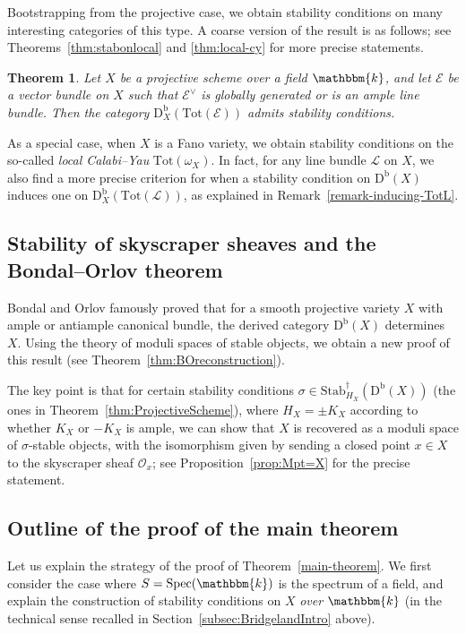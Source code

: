 \documentclass[11pt, reqno]{amsart}
\numberwithin{equation}{section}
\theoremstyle{plain}
\newtheorem{theorem}{Theorem}[section]
\theoremstyle{remark}
\theoremstyle{definition}
\theoremstyle{italicsname}
\newcommand{\Db}{\mathrm{D^b}}
\newcommand{\Stabdagger}{\mathrm{Stab}^\dagger}
\DeclareMathOperator{\Spec}{Spec}
\newcommand{\cO}{\mathcal{O}}
\newcommand{\cE}{\mathcal{E}}
\newcommand{\cL}{\mathcal{L}}
\newcommand{\KK}{\mathbbm{k}}
\begin{document}
Bootstrapping from the projective case, we obtain stability conditions on many interesting categories of this type. 
A coarse version of the result is as follows; see Theorems~\ref{thm:stabonlocal} and \ref{thm:local-cy} for more precise statements. 

\begin{theorem}\label{thm:LocalMain}
Let $X$ be a projective scheme over a field $\KK$, and let $\cE$ be a vector bundle on $X$ such that $\cE^{\vee}$ is globally generated or is an ample line bundle. 
Then the category $\mathrm{D}_X^{\mathrm{b}}(\mathrm{Tot}(\cE))$ admits stability conditions.
\end{theorem}

As a special case, when $X$ is a Fano variety, we obtain stability conditions on the so-called \emph{local Calabi--Yau} $\mathrm{Tot}(\omega_X)$. 
In fact, for any line bundle $\cL$ on $X$, we also find a more precise criterion for when a stability condition on $\Db(X)$ induces one on $\mathrm{D}_X^{\mathrm{b}}(\mathrm{Tot}(\cL))$, as explained in Remark~\ref{remark-inducing-TotL}. 

\subsection{Stability of skyscraper sheaves and the Bondal--Orlov theorem} 
\label{section-intro-BO} 
Bondal and Orlov famously proved that for a smooth projective variety $X$ with ample or antiample canonical bundle, the derived category $\Db(X)$ determines $X$. 
Using the theory of moduli spaces of stable objects, we obtain a new proof of this result (see Theorem~\ref{thm:BOreconstruction}). 

The key point is that for certain stability conditions $\sigma \in \Stabdagger_{H_X}(\Db(X))$ (the ones in Theorem~\ref{thm:ProjectiveScheme}), where $H_X = \pm K_X$ according to whether $K_X$ or $-K_X$ is ample, we can show that $X$ is recovered as a moduli space of $\sigma$-stable objects, with the isomorphism given by sending a closed point $x \in X$ to the skyscraper sheaf $\cO_x$; see Proposition~\ref{prop:Mpt=X} for the precise statement. 

\subsection{Outline of the proof of the main theorem} 

Let us explain the strategy of the proof of Theorem~\ref{main-theorem}. 
We first consider the case where $S = \Spec(\KK)$ is the spectrum of a field, and explain the construction of stability conditions on $X$ \emph{over $\KK$} (in the technical sense recalled in Section~\ref{subsec:BridgelandIntro} above). 
\end{document}

